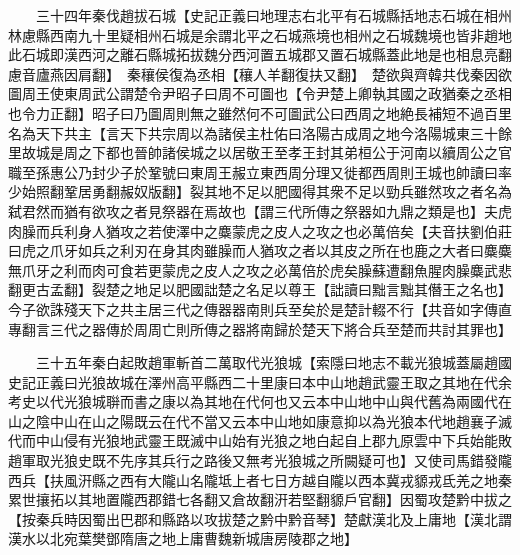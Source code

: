　　三十四年秦伐趙拔石城【史記正義曰地理志右北平有石城縣括地志石城在相州林慮縣西南九十里疑相州石城是余謂北平之石城燕境也相州之石城魏境也皆非趙地此石城即漢西河之離石縣城拓拔魏分西河置五城郡又置石城縣蓋此地是也相息亮翻慮音廬燕因肩翻】　秦穰侯復為丞相【穰人羊翻復扶又翻】　楚欲與齊韓共伐秦因欲圖周王使東周武公謂楚令尹昭子曰周不可圖也【令尹楚上卿執其國之政猶秦之丞相也令力正翻】昭子曰乃圖周則無之雖然何不可圖武公曰西周之地絶長補短不過百里名為天下共主【言天下共宗周以為諸侯主杜佑曰洛陽古成周之地今洛陽城東三十餘里故城是周之下都也晉帥諸侯城之以居敬王至孝王封其弟桓公于河南以續周公之官職至孫惠公乃封少子於鞏號曰東周王赧立東西周分理又徙都西周則王城也帥讀曰率少始照翻鞏居勇翻赧奴版翻】裂其地不足以肥國得其衆不足以勁兵雖然攻之者名為弑君然而猶有欲攻之者見祭器在焉故也【謂三代所傳之祭器如九鼎之類是也】夫虎肉臊而兵利身人猶攻之若使澤中之麋蒙虎之皮人之攻之也必萬倍矣【夫音扶劉伯莊曰虎之爪牙如兵之利刃在身其肉雖臊而人猶攻之者以其皮之所在也鹿之大者曰麋麋無爪牙之利而肉可食若更蒙虎之皮人之攻之必萬倍於虎矣臊蘇遭翻魚腥肉臊麋武悲翻更古孟翻】裂楚之地足以肥國詘楚之名足以尊王【詘讀曰黜言黜其僭王之名也】今子欲誅殘天下之共主居三代之傳器器南則兵至矣於是楚計輟不行【共音如字傳直專翻言三代之器傳於周周亡則所傳之器將南歸於楚天下將合兵至楚而共討其罪也】

　　三十五年秦白起敗趙軍斬首二萬取代光狼城【索隱曰地志不載光狼城蓋屬趙國史記正義曰光狼故城在澤州高平縣西二十里康曰本中山地趙武靈王取之其地在代余考史以代光狼城聨而書之康以為其地在代何也又云本中山地中山與代舊為兩國代在山之陰中山在山之陽既云在代不當又云本中山地如康意抑以為光狼本代地趙襄子滅代而中山侵有光狼地武靈王既滅中山始有光狼之地白起自上郡九原雲中下兵始能敗趙軍取光狼史既不先序其兵行之路後又無考光狼城之所闕疑可也】又使司馬錯發隴西兵【扶風汧縣之西有大隴山名隴坻上者七日方越自隴以西本冀戎䝠戎氐羌之地秦累世攘拓以其地置隴西郡錯七各翻又倉故翻汧若堅翻䝠戶官翻】因蜀攻楚黔中拔之【按秦兵時因蜀出巴郡和縣路以攻拔楚之黔中黔音琴】楚獻漢北及上庸地【漢北謂漢水以北宛葉樊鄧隋唐之地上庸曹魏新城唐房陵郡之地】

